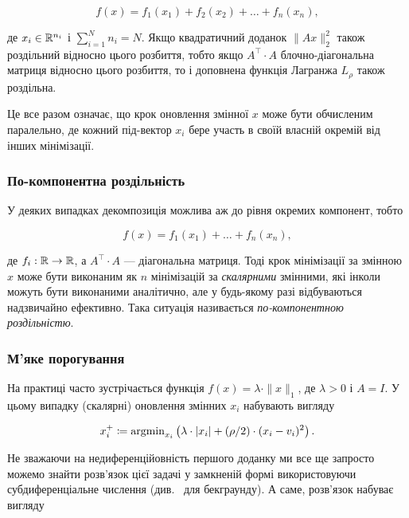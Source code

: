 \begin{equation}
    f(x) = f_1(x_1) + f_2(x_2) + \ldots + f_n(x_n), 
\end{equation}

де $x_i \in \mathbb{R}^{n_i}$ і $\sum_{i = 1}^N n_i = N$. Якщо квадратичний доданок $\|A x\|_2^2$ також роздільний відносно цього розбиття, тобто якщо $A^\intercal \cdot A$ блочно-діагональна матриця відносно цього розбиття, то і доповнена функція Лагранжа $L_\rho$ також роздільна. \medskip

Це все разом означає, що крок оновлення змінної $x$ може бути обчисленим паралельно, де кожний під-вектор $x_i$ бере участь в своїй власній окремій від інших мінімізації.

\subsubsection{По-компонентна роздільність}

У деяких випадках декомпозиція можлива аж до рівня окремих компонент, тобто 

\begin{equation}
    f(x) = f_1(x_1) + \ldots + f_n(x_n), 
\end{equation}

де $f_i: \mathbb{R} \to \mathbb{R}$, а  $A^\intercal \cdot A$ --- діагональна матриця. Тоді крок мінімізації за змінною $x$ може бути виконаним як $n$ мінімізацій за \textit{скалярними} змінними, які інколи можуть бути виконаними аналітично, але у будь-якому разі відбуваються надзвичайно ефективно. Така ситуація називається \textit{по-компонентною роздільністю}.

\subsubsection{М'яке порогування}

\begin{example}
    На практиці часто зустрічається функція $f(x) = \lambda \cdot \|x\|_1$, де $\lambda > 0$ і $A = I$. У цьому випадку (скалярні) оновлення змінних $x_i$ набувають вигляду
    
    \begin{equation}
        x_i^+ \coloneqq \operatorname{argmin}_{x_i}  \left( \lambda \cdot |x_i| + (\rho / 2) \cdot (x_i - v_i)^2 \right).
    \end{equation}
\end{example}

Не зважаючи на недиференційовність першого доданку ми все ще запросто можемо знайти розв'язок цієї задачі у замкненій формі використовуючи субдиференціальне числення (див.~\cite[\S23]{140} для бекграунду). А саме, розв'язок набуває вигляду

